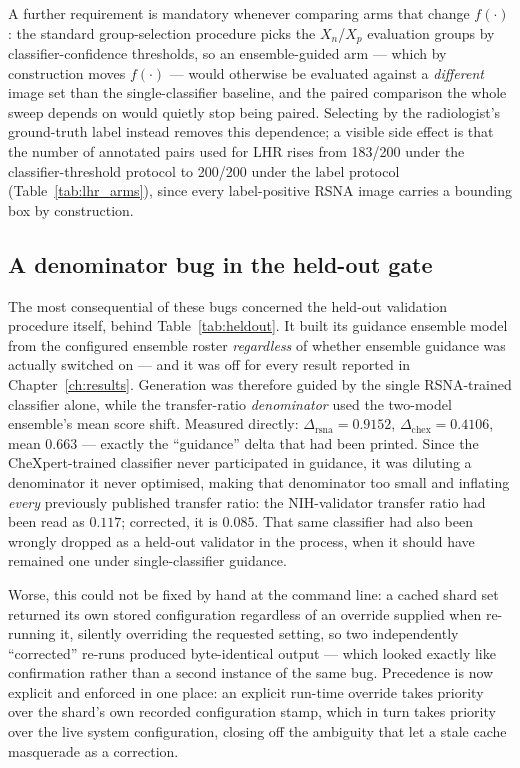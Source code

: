A further requirement is mandatory whenever comparing arms that change
$f(\cdot)$: the standard group-selection procedure picks the $X_n$/$X_p$
evaluation groups by classifier-confidence thresholds, so an
ensemble-guided arm --- which by construction moves $f(\cdot)$ --- would
otherwise be evaluated against a \emph{different} image set than the
single-classifier baseline, and the paired comparison the whole sweep
depends on would quietly stop being paired. Selecting by the
radiologist's ground-truth label instead removes this dependence; a
visible side effect is that the number of annotated pairs used for LHR
rises from 183/200 under the classifier-threshold protocol to 200/200
under the label protocol (Table~\ref{tab:lhr_arms}), since every
label-positive RSNA image carries a bounding box by construction.

\subsection{A denominator bug in the held-out gate}
\label{sec:denominator_bug}

The most consequential of these bugs concerned the held-out validation
procedure itself, behind Table~\ref{tab:heldout}. It built its guidance
ensemble model from the configured ensemble roster \emph{regardless} of
whether ensemble guidance was actually switched on --- and it was off for
every result reported in Chapter~\ref{ch:results}. Generation was
therefore guided by the single RSNA-trained classifier alone, while the
transfer-ratio \emph{denominator} used the two-model ensemble's mean
score shift. Measured directly: $\Delta_{\text{rsna}} = 0.9152$,
$\Delta_{\text{chex}} = 0.4106$, mean $0.663$ --- exactly the
``guidance'' delta that had been printed. Since the CheXpert-trained
classifier never participated in guidance, it was diluting a denominator
it never optimised, making that denominator too small and inflating
\emph{every} previously published transfer ratio: the NIH-validator
transfer ratio had been read as $0.117$; corrected, it is $0.085$. That
same classifier had also been wrongly dropped as a held-out validator in
the process, when it should have remained one under single-classifier
guidance.

Worse, this could not be fixed by hand at the command line: a cached
shard set returned its own stored configuration regardless of an
override supplied when re-running it, silently overriding the requested
setting, so two independently ``corrected'' re-runs produced
byte-identical output --- which looked exactly like confirmation rather
than a second instance of the same bug. Precedence is now explicit and
enforced in one place: an explicit run-time override takes priority over
the shard's own recorded configuration stamp, which in turn takes
priority over the live system configuration, closing off the ambiguity
that let a stale cache masquerade as a correction.

